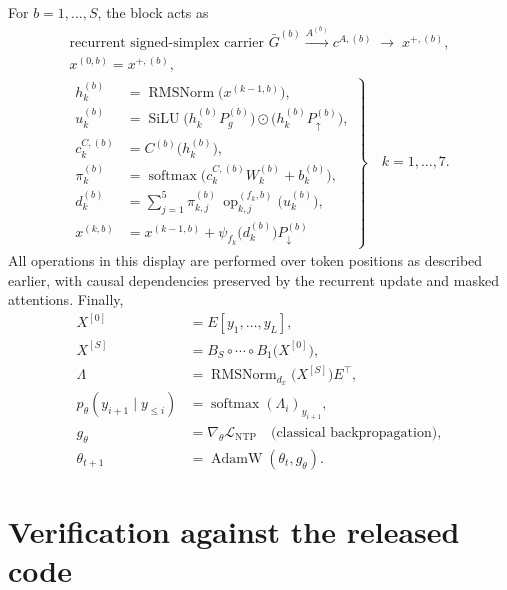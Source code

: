 \documentclass[11pt,a4paper]{article}
\newcommand{\rmsn}{\operatorname{RMSNorm}}
\newcommand{\SiLU}{\operatorname{SiLU}}
\newcommand{\softmax}{\operatorname{softmax}}
\newcommand{\Gbar}{\bar G}
\newcommand{\up}{{\uparrow}}
\newcommand{\dn}{{\downarrow}}
\newcommand{\op}{\operatorname{op}}
\newcommand{\T}{\top}
\begin{document}
For $b=1,\dots,S$, the block acts as
\begin{equation}
\boxed{
\begin{array}{c}
\text{recurrent signed-simplex carrier }\Gbar^{(b)}\xrightarrow{A^{(b)}}c^{A,(b)}\;\longrightarrow\;x^{+,(b)},\\[3pt]
x^{(0,b)}=x^{+,(b)},\\[3pt]
\left.\begin{aligned}
h_k^{(b)}&=\rmsn\bigl(x^{(k-1,b)}\bigr),\\
u_k^{(b)}&=\SiLU\bigl(h_k^{(b)}P_g^{(b)}\bigr)\odot\bigl(h_k^{(b)}P_\up^{(b)}\bigr),\\
c_k^{C,(b)}&=C^{(b)}\bigl(h_k^{(b)}\bigr),\\
\pi_k^{(b)}&=\softmax\bigl(c_k^{C,(b)}W_k^{(b)}+b_k^{(b)}\bigr),\\
d_k^{(b)}&=\textstyle\sum_{j=1}^{5}\pi_{k,j}^{(b)}\,\op_{k,j}^{(f_k,b)}\bigl(u_k^{(b)}\bigr),\\
x^{(k,b)}&=x^{(k-1,b)}+\psi_{f_k}\bigl(d_k^{(b)}\bigr)P_\dn^{(b)}
\end{aligned}\right\}\quad k=1,\dots,7.
\end{array}}
\end{equation}
All operations in this display are performed over token positions as described earlier, with causal
dependencies preserved by the recurrent update and masked attentions. Finally,
\begin{equation}
\boxed{
\begin{aligned}
X^{[0]}&=E[y_1,\dots,y_L],\\
X^{[S]}&=B_S\circ\cdots\circ B_1\bigl(X^{[0]}\bigr),\\
\Lambda&=\rmsn_{d_x}\bigl(X^{[S]}\bigr)E^{\T},\\
p_\theta(y_{i+1}\mid y_{\le i})&=\softmax(\Lambda_i)_{y_{i+1}},\\
g_\theta&=\nabla_\theta\mathcal L_{\mathrm{NTP}}\quad\text{(classical backpropagation)},\\
\theta_{t+1}&=\operatorname{AdamW}(\theta_t,g_\theta).
\end{aligned}}
\end{equation}

\section*{Verification against the released code}
\end{document}
